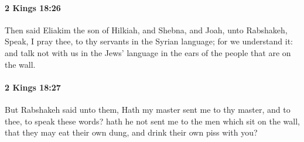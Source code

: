 		\paragraph{2 Kings 18:26} %
			\label{2KINGS-18-26}

			Then said Eliakim the son of Hilkiah, and Shebna, and Joah, unto Rabshakeh, Speak, I pray thee, to thy servants in the Syrian language; for we understand it: and talk not with us in the Jews’ language in the ears of the people that are on the wall.


		\paragraph{2 Kings 18:27} %
			\label{2KINGS-18-27}

			But Rabshakeh said unto them, Hath my master sent me to thy master, and to thee, to speak these words? hath he not sent me to the men which sit on the wall, that they may eat their own dung, and drink their own piss with you?

